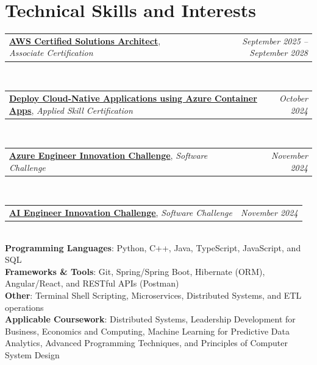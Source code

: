 \documentclass[a4paper,11pt]{article}
\makeatletter
\newcommand{\sectionspace}{\vspace{-0pt}}
\newcommand{\resumeSkillInterest}[3]{
    \begin{tabular*}{0.98\textwidth}[t]{l@{\extracolsep{\fill}}r}
        \textbf{#1}, \footnotesize{\textit{#2}} & \textit{\footnotesize{#3}} \\
    \end{tabular*}
}
\newcommand{\bulletend}{}
\makeatother
\begin{document}
\vspace{-6.5mm}%
\sectionspace
\section{\textbf{Technical Skills and Interests}}
\begin{itemize}[leftmargin=0.05in, label={}]
    \small{
    \item{
              \resumeSkillInterest{\href{https://www.credly.com/earner/earned/badge/3ae08fdb-6123-4f57-ac4c-d59037d25728}{AWS Certified Solutions Architect}}{Associate Certification}{September 2025 -- September 2028} \\
              \resumeSkillInterest{\href{https://learn.microsoft.com/api/credentials/share/en-us/HassanAbioye-6919/EC85A5F86459ABDE?sharingId=88D6874D9B396A8B}{Deploy Cloud-Native Applications using Azure Container Apps}}{Applied Skill Certification}{October 2024} \\
              \resumeSkillInterest{\href{https://learn.microsoft.com/en-us/challenges/1p5f0wj02x5my/leaderboard}{Azure Engineer Innovation Challenge}}{Software Challenge}{November 2024} \\
              \resumeSkillInterest{\href{https://learn.microsoft.com/en-us/challenges/6n8t64dyww1m8/leaderboard}{AI Engineer Innovation Challenge}}{Software Challenge}{November 2024} \\
              \textbf{Programming Languages}{: Python, C++, Java, TypeScript, JavaScript, and SQL} \\
              \textbf{Frameworks \& Tools}{: Git, Spring/Spring Boot, Hibernate (ORM), Angular/React, and RESTful APIs (Postman)} \\
              \textbf{Other}{: Terminal Shell Scripting, Microservices, Distributed Systems, and ETL operations\bulletend} \\
              \textbf{Applicable Coursework}{: Distributed Systems, Leadership Development for Business, Economics and Computing, Machine Learning for Predictive Data Analytics, Advanced Programming Techniques, and Principles of Computer System Design\bulletend} \\
          }}
\end{itemize}
\vspace{-7.0mm}%
\sectionspace
\end{document}
